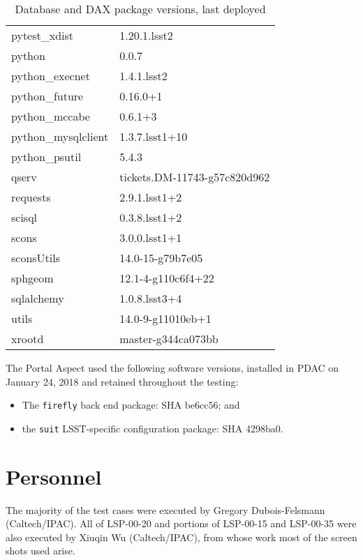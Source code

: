 \documentclass[DM,lsstdraft,STR,toc]{lsstdoc}
\begin{document}
\begin{table}[h]
\begin{tabular}{l l}
pytest\_xdist       &   1.20.1.lsst2  \\
python             &   0.0.7       \\
python\_execnet     &   1.4.1.lsst2  \\
python\_future      &   0.16.0+1    \\
python\_mccabe      &   0.6.1+3     \\
python\_mysqlclient &   1.3.7.lsst1+10  \\
python\_psutil      &   5.4.3       \\
qserv              &   tickets.DM-11743-g57c820d962  \\
requests           &   2.9.1.lsst1+2  \\
scisql             &   0.3.8.lsst1+2  \\
scons              &   3.0.0.lsst1+1  \\
sconsUtils         &   14.0-15-g79b7e05  \\
sphgeom            &   12.1-4-g110c6f4+22  \\
sqlalchemy         &   1.0.8.lsst3+4  \\
utils              &   14.0-9-g11010eb+1  \\
xrootd             &   master-g344ca073bb  \\
\end{tabular}
\caption{Database and DAX package versions, last deployed}
\label{tab:dax-versions}
\end{table}


The Portal Aspect used the following software versions, installed in PDAC on January 24, 2018 and retained throughout the testing:

\begin{itemize}
\item{The \verb|firefly| back end package: SHA be6cc56; and}
\item{the \verb|suit| LSST-specific configuration package: SHA 4298ba0.}
\end{itemize}


\section{Personnel}
\label{sect:personnel}

The majority of the test cases were executed by Gregory Dubois-Felsmann (Caltech/IPAC).
All of LSP-00-20 and portions of LSP-00-15 and LSP-00-35 were also executed by Xiuqin Wu (Caltech/IPAC),
from whose work most of the screen shots used arise.
\end{document}
